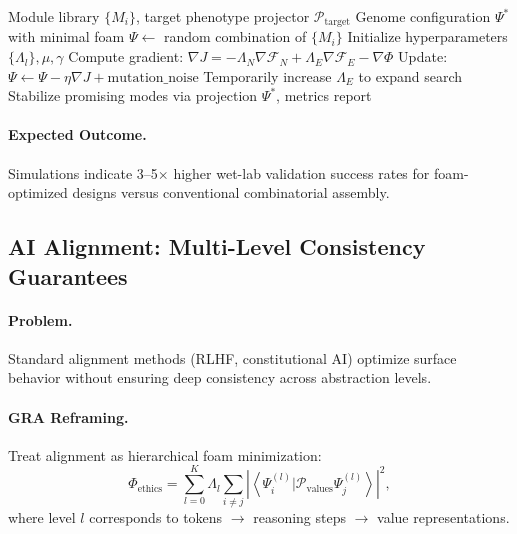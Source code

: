 \documentclass[11pt,a4paper]{article}
\theoremstyle{plain}
\theoremstyle{definition}
\theoremstyle{remark}
\newcommand{\Foam}{\Phi}
\newcommand{\Projector}{\mathcal{P}}
\newcommand{\Functional}{\mathcal{F}}
\newcommand{\grad}{\nabla}
\newcommand{\braket}[2]{\left\langle#1|#2\right\rangle}
\begin{document}
\begin{algorithm}[H]
\caption{GRA\_SynBio\_Design: Foam-minimizing genome assembly}
\label{alg:synbio}
\begin{algorithmic}[1]
\Require Module library $\{M_i\}$, target phenotype projector $\Projector_{\text{target}}$
\Ensure Genome configuration $\Psi^*$ with minimal foam
\State $\Psi \gets$ random combination of $\{M_i\}$
\State Initialize hyperparameters $\{\Lambda_l\}, \mu, \gamma$
\While{$\Foam[\Psi] > \epsilon$ or $\Functional_N[\Psi] < F_{\text{target}}$}
    \State Compute gradient: $\grad J = -\Lambda_N \grad\Functional_N + \Lambda_E \grad\Functional_E - \grad\Foam$
    \State Update: $\Psi \gets \Psi - \eta \grad J + \text{mutation\_noise}$
    \State {} 
        \State Temporarily increase $\Lambda_E$ to expand search
        \State Stabilize promising modes via projection
    \EndIf
\EndWhile
\State \Return $\Psi^*$, metrics report
\end{algorithmic}
\end{algorithm}

\paragraph{Expected Outcome.} Simulations indicate 3--5$\times$ higher wet-lab validation success rates for foam-optimized designs versus conventional combinatorial assembly.

\subsection{AI Alignment: Multi-Level Consistency Guarantees}

\paragraph{Problem.} Standard alignment methods (RLHF, constitutional AI) optimize surface behavior without ensuring deep consistency across abstraction levels.

\paragraph{GRA Reframing.} Treat alignment as hierarchical foam minimization:
\begin{equation}
\Foam_{\text{ethics}} = \sum_{l=0}^K \Lambda_l \sum_{i \neq j} \left| \braket{\Psi_i^{(l)}}{\Projector_{\text{values}} \Psi_j^{(l)}} \right|^2,
\label{eq:ethics_foam}
\end{equation}
where level $l$ corresponds to tokens $\to$ reasoning steps $\to$ value representations.
\end{document}
